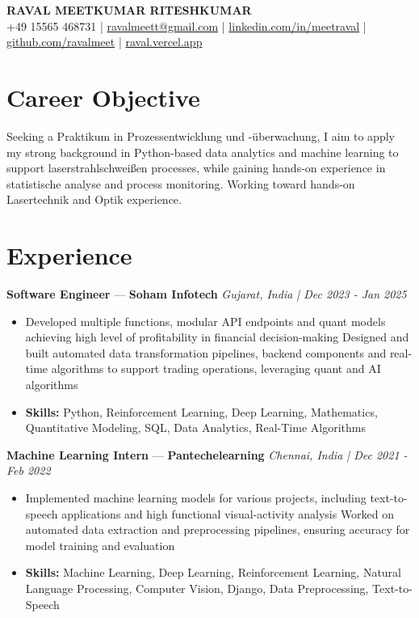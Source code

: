 \documentclass[a4paper,10pt]{article}
\begin{document}
\begin{center}
  {\Large\bfseries RAVAL MEETKUMAR RITESHKUMAR}\\[2pt]
  {\small +49 15565 468731 \;|\; \href{mailto:ravalmeett@gmail.com}{ravalmeett@gmail.com} \;|\; \href{https://www.linkedin.com/in/meetraval/}{linkedin.com/in/meetraval} \;|\; \href{https://github.com/ravalmeet}{github.com/ravalmeet} \;|\; \href{https://raval.vercel.app/}{raval.vercel.app}}
\end{center}
\vspace{-3pt}

\section*{Career Objective}
Seeking a Praktikum in Prozessentwicklung und -überwachung, I aim to apply my strong background in Python-based data analytics and machine learning to support laserstrahlschweißen processes, while gaining hands-on experience in statistische analyse and process monitoring. Working toward hands-on Lasertechnik and Optik experience.\par

\section*{Experience}
\textbf{Software Engineer} — \textbf{Soham Infotech} \hfill \textit{Gujarat, India \;|\; Dec 2023 - Jan 2025}\par
\vspace{1pt}
\begin{itemize}
  \item Developed multiple functions, modular API endpoints and quant models achieving high level of profitability in financial decision-making Designed and built automated data transformation pipelines, backend components and real-time algorithms to support trading operations, leveraging quant and AI algorithms
  \item \textbf{Skills:} Python, Reinforcement Learning, Deep Learning, Mathematics, Quantitative Modeling, SQL, Data Analytics, Real-Time Algorithms
\end{itemize}
\vspace{3pt}
\textbf{Machine Learning Intern} — \textbf{Pantechelearning} \hfill \textit{Chennai, India \;|\; Dec 2021 - Feb 2022}\par
\vspace{1pt}
\begin{itemize}
  \item Implemented machine learning models for various projects, including text-to-speech applications and high functional visual-activity analysis Worked on automated data extraction and preprocessing pipelines, ensuring accuracy for model training and evaluation
  \item \textbf{Skills:} Machine Learning, Deep Learning, Reinforcement Learning, Natural Language Processing, Computer Vision, Django, Data Preprocessing, Text-to-Speech
\end{itemize}
\end{document}
